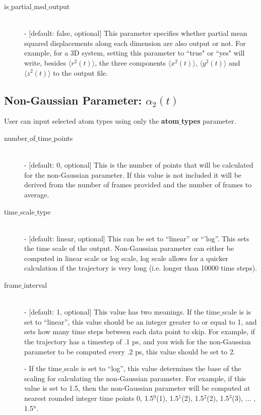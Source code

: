 \documentclass{article}
\begin{document}
\begin{description}
	\item[is$\_$partial$\_$msd$\_$output] \hfill \\
	- [default: false, optional] This parameter specifies whether partial mean squared displacements along each dimension are also output or not. For example, for a 3D system, setting this parameter to ``true" or ``yes" will write, besides $\langle r^2(t) \rangle$, the three components $\langle x^2(t) \rangle$, $\langle y^2(t) \rangle$ and $\langle z^2(t) \rangle$ to the output file. 
		
\end{description}


\subsection{Non-Gaussian Parameter: $\alpha_2(t)$} \label{sec::alpha2_parm}
User can input selected atom types using only the \textbf{atom$\_$types} parameter.
\begin{description}	
	\item[number$\_$of$\_$time$\_$points]\hfill \\
	- [default: 0, optional] This is the number of points that will be calculated for the non-Gaussian parameter.  If this value is not included it will be derived from the number of frames provided and the number of frames to average.
	
	\item[time$\_$scale$\_$type] \hfill \\
	- [default: linear, optional] This can be set to ``linear'' or ``'log''.  This sets the time scale of the output. Non-Gaussian parameter can either be computed in linear scale or log scale, log scale allows for a quicker calculation if the trajectory is very long (i.e. longer than 10000 time steps).
	
	\item[frame$\_$interval] \hfill \\
	- [default: 1, optional] This value has two meanings.  If the time$\_$scale is is set to ``linear'', this value should be an integer greater to or equal to 1, and sets how many time steps between each data point to skip.  For example, if the trajectory has a timestep of .1 ps, and you wish for the non-Gaussian parameter to be computed every .2 ps, this value should be set to 2. 
	
	- If the time$\_$scale is set to ``log'', this value determines the base of the scaling for calculating the non-Gaussian parameter.   For example, if this value is set to 1.5, then the non-Gaussian parameter will be computed at nearest rounded integer time points 0, 1.5$^0$(1), 1.5$^1$(2), 1.5$^2$(2), 1.5$^3$(3), ... , 1.5$^{n}$.
	
\end{description}
\end{document}
